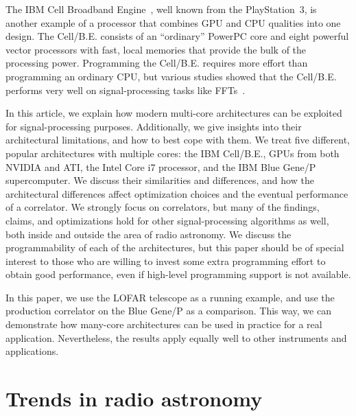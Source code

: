\documentclass{article}
\begin{document}
The IBM Cell Broadband Engine~\cite{cell}, well known from the
PlayStation~3, is another example of a processor that combines GPU and CPU
qualities into one design.
The Cell/B.E. consists of an ``ordinary'' PowerPC core and eight powerful
vector processors with fast, local memories that provide
the bulk of the processing power.
Programming the Cell/B.E. requires more effort than programming an ordinary CPU,
but various studies showed that the Cell/B.E. performs very well on
signal-processing tasks like FFTs~\cite{fftc}.

In this article, we explain how modern multi-core architectures can be
exploited for signal-processing purposes.  Additionally, we give
insights into their architectural limitations, and how to best cope
with them.  We treat five different, popular architectures with
multiple cores: the IBM Cell/B.E., GPUs from both NVIDIA and ATI, the Intel Core i7 processor, and
the IBM Blue Gene/P supercomputer.  We discuss their
similarities and differences, and how the architectural differences
affect optimization choices and the eventual performance of a
correlator.  We strongly focus on correlators, but many of the
findings, claims, and optimizations hold for other signal-processing
algorithms as well, both inside and outside the area of radio astronomy.
We discuss the programmability of each of the architectures, but this
paper should be of special interest to those who are willing to invest
some extra programming effort to obtain good performance, even if
high-level programming support is not available.

In this paper, we use the LOFAR telescope as a running example, and
use the production correlator on the Blue Gene/P as a comparison. This way,
we can demonstrate how many-core architectures can be used in practice for a real
application. Nevertheless, the results apply equally well to other
instruments and applications.


\section{Trends in radio astronomy}



\end{document}
